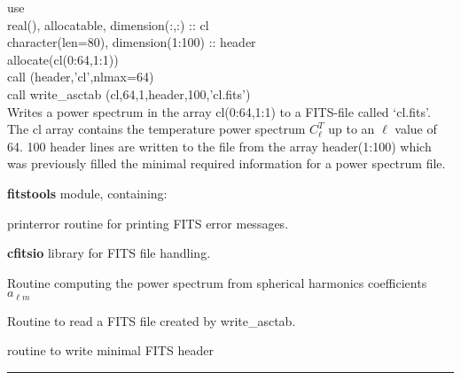 \begin{example}
{
use \\
real(), allocatable, dimension(:,:) :: cl \\
character(len=80), dimension(1:100) :: header \\
allocate(cl(0:64,1:1))\\
call (header,'cl',nlmax=64)\\
call write\_asctab (cl,64,1,header,100,'cl.fits')  \\
}
{
Writes a power spectrum in the array cl(0:64,1:1) to a FITS-file called `cl.fits'. The cl array contains the temperature power spectrum $C_\ell^T$ up to an $\ell$ value of 64. 100 header lines are written to the file from the array header(1:100) which was previously filled the minimal required information for a power spectrum file.
}
\end{example}

\begin{modules}
  \begin{sulist}{} %
  \item[\textbf{fitstools}] module, containing:
  \item[printerror] routine for printing FITS error messages.
  \item[\textbf{cfitsio}] library for FITS file handling.		
  \end{sulist}
\end{modules}

\begin{related}
  \begin{sulist}{} %
  \item[\htmlref{alm2cl}{sub:alm2cl}] Routine computing the power spectrum from
  spherical harmonics coefficients $a_{\ell m}$
  \item[\htmlref{fits2cl}{sub:fits2cl}] Routine to read a FITS file created by write\_asctab.
  \item[\htmlref{write\_minimal\_header}{sub:write_minimal_header}] routine to write minimal FITS header
  \end{sulist}
\end{related}

\rule{\hsize}{2mm}

\newpage
